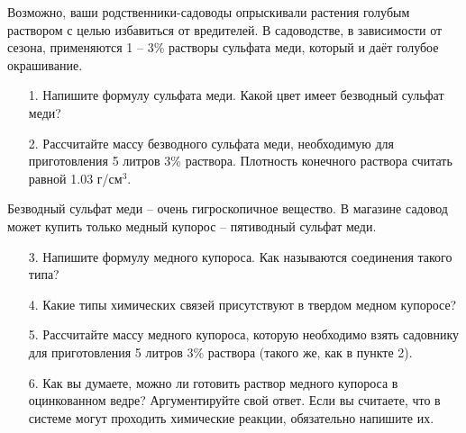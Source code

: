 
Возможно, ваши родственники-садоводы опрыскивали растения голубым раствором с целью избавиться от вредителей. В садоводстве, в зависимости от сезона, применяются 1 – 3\% растворы сульфата меди, который и даёт голубое окрашивание.
\begin{enumerate}
\item[1.] Напишите формулу сульфата меди. Какой цвет имеет безводный сульфат меди? 
\item[2.] Рассчитайте массу безводного сульфата меди, необходимую для приготовления 5 литров 3\% раствора. Плотность конечного раствора считать равной 1.03 г/см$^3$.
\end{enumerate}
Безводный сульфат меди – очень гигроскопичное вещество. В магазине садовод может купить только медный купорос – пятиводный сульфат меди.
\begin{enumerate}
\item[3.] Напишите формулу медного купороса. Как называются соединения такого типа?
\item[4.] Какие типы химических связей присутствуют в твердом медном купоросе?
\item[5.] Рассчитайте массу медного купороса, которую необходимо взять садовнику для приготовления 5 литров 3\% раствора (такого же, как в пункте 2). 
\item[6.] Как вы думаете, можно ли готовить раствор медного купороса в оцинкованном ведре? Аргументируйте свой ответ. Если вы считаете, что в системе могут проходить химические реакции, обязательно напишите их.
\end{enumerate}